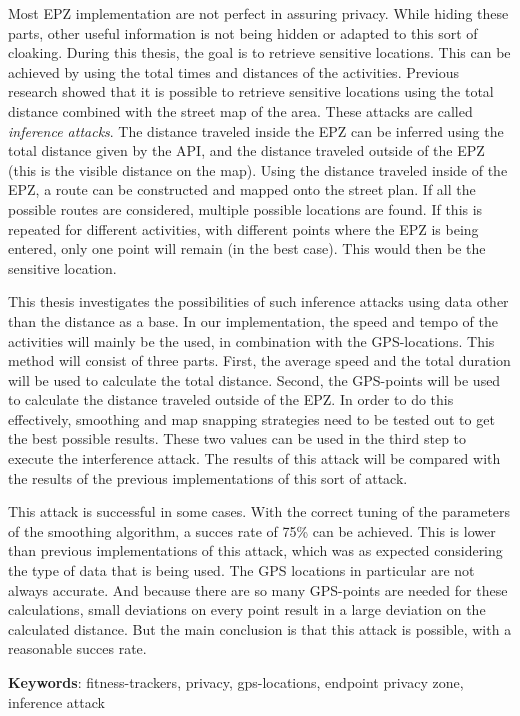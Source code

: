 Most EPZ implementation are not perfect in assuring privacy. While hiding these
parts, other useful information is not being hidden or adapted to this sort of
cloaking. During this thesis, the goal is to retrieve sensitive locations. This
can be achieved by using the total times and distances of the activities.
Previous research showed that it is possible to retrieve sensitive locations
using the total distance combined with the street map of the area. These
attacks are called \textit{inference attacks}. The distance traveled inside the
EPZ can be inferred using the total distance given by the API, and the distance
traveled outside of the EPZ (this is the visible distance on the map). Using
the distance traveled inside of the EPZ, a route can be constructed and mapped
onto the street plan. If all the possible routes are considered, multiple
possible locations are found. If this is repeated for different activities,
with different points where the EPZ is being entered, only one point will
remain (in the best case). This would then be the sensitive location.

This thesis investigates the possibilities of such inference attacks using data
other than the distance as a base. In our implementation, the speed and tempo
of the activities will mainly be the used, in combination with the
GPS-locations. This method will consist of three parts. First, the average
speed and the total duration will be used to calculate the total distance.
Second, the GPS-points will be used to calculate the distance traveled outside
of the \ac{EPZ}. In order to do this effectively, smoothing and map snapping
strategies need to be tested out to get the best possible results. These two
values can be used in the third step to execute the interference attack. The
results of this attack will be compared with the results of the previous
implementations of this sort of attack.

This attack is successful in some cases. With the correct tuning of the
parameters of the smoothing algorithm, a succes rate of 75\% can be achieved.
This is lower than previous implementations of this attack, which was as
expected considering the type of data that is being used. The GPS locations in
particular are not always accurate. And because there are so many GPS-points
are needed for these calculations, small deviations on every point result in a
large deviation on the calculated distance. But the main conclusion is that
this attack is possible, with a reasonable succes rate.

\textbf{Keywords}: fitness-trackers, privacy, gps-locations, endpoint privacy zone, inference attack